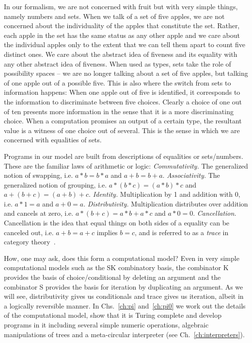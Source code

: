 \documentclass{article}
\begin{document}
In our formalism, we are not concerned with fruit but with very simple
things, namely numbers and sets. When we talk of a set of five apples,
we are not concerned about the individuality of the apples that
constitute the set. Rather, each apple in the set has the same status
as any other apple and we care about the individual apples only to the
extent that we can tell them apart to count five distinct ones. We
care about the abstract idea of fiveness and its equality with any
other abstract idea of fiveness.  When used as types, sets take the
role of possibility spaces -- we are no longer talking about a set of
five apples, but talking of one apple out of a possible five. This is
also where the switch from sets to information happens: When one apple
out of five is identified, it corresponds to the information to
discriminate between five choices. Clearly a choice of one out of ten
presents more information in the sense that it is a more
discriminating choice. When a computation promises an output of a
certain type, the resultant value is a witness of one choice out of
several. This is the sense in which we are concerned with equalities
of sets.

Programs in our model are built from descriptions of equalities or
sets/numbers. These are the familiar laws of arithmetic or logic:
\emph{Commutativity.} The generalized notion of swapping,
i.e. $a*b=b*a$ and $a+b=b+a$.
\emph{Associativity.} The
generalized notion of grouping, i.e. $a*(b*c)=(a*b)*c$ and
$a+(b+c)=(a+b)+c$.
\emph{Identity.} Multiplication by 1 and addition with 0,
  i.e. $a*1=a$ and $a+0=a$.
\emph{Distributivity.} Multiplication distributes over addition
  and cancels at zero, i.e. $a*(b+c)=a*b+a*c$ and $a*0=0$.
\emph{Cancellation.} Cancellation is the idea that equal things
  on both sides of a equality can be canceled out, i.e. $a+b=a+c$
  implies $b=c$, and is referred to as a \emph{trace} in category
  theory~\cite{joyal1996traced}.

How, one may ask, does this form a computational model? Even in very
simple computational models such as the SK combinatory basis, the
combinator K provides the basis of choice/conditional by deleting an
argument and the combinator S provides the basis for iteration by
duplicating an argument. As we will see, distributivity gives us
conditionals and trace gives us iteration, albeit in a logically
reversible manner.  In Chs.~\ref{ch:pi} and~\ref{ch:pi0} we work out
the details of the computational model, show that it is Turing
complete and develop programs in it including several simple numeric
operations, algebraic manipulations of trees and a meta-circular
interpreter (see Ch.~\ref{ch:interpreters}).
\end{document}
